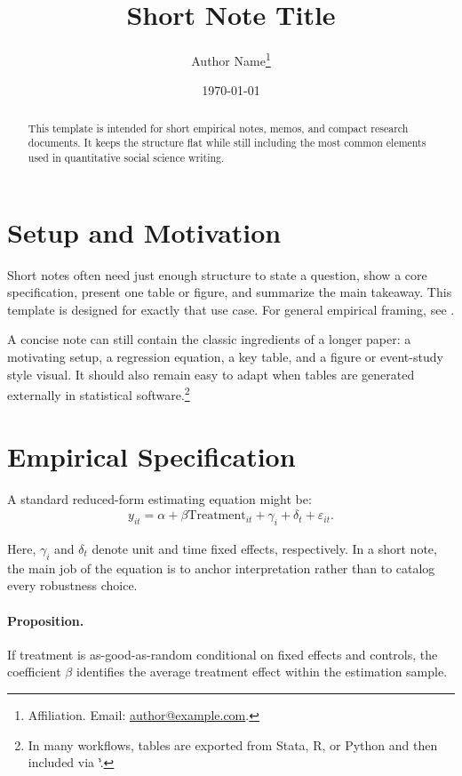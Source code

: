 \documentclass[11pt]{article}
\title{Short Note Title}
\author{Author Name\thanks{Affiliation. Email: \href{mailto:author@example.com}{author@example.com}.}}
\date{\today}
\begin{document}
\maketitle

\begin{abstract}
This template is intended for short empirical notes, memos, and compact research documents. It keeps the structure flat while still including the most common elements used in quantitative social science writing.
\end{abstract}

\section{Setup and Motivation}

Short notes often need just enough structure to state a question, show a core specification, present one table or figure, and summarize the main takeaway. This template is designed for exactly that use case. For general empirical framing, see \citet{angrist2001}.

A concise note can still contain the classic ingredients of a longer paper: a motivating setup, a regression equation, a key table, and a figure or event-study style visual. It should also remain easy to adapt when tables are generated externally in statistical software.\footnote{In many workflows, tables are exported from Stata, R, or Python and then included via `\`.}

\section{Empirical Specification}

A standard reduced-form estimating equation might be:
\begin{align}
    y_{it} = \alpha + \beta \text{Treatment}_{it} + \gamma_i + \delta_t + \varepsilon_{it}.
\end{align}

Here, $\gamma_i$ and $\delta_t$ denote unit and time fixed effects, respectively. In a short note, the main job of the equation is to anchor interpretation rather than to catalog every robustness choice.

\paragraph{Proposition.} If treatment is as-good-as-random conditional on fixed effects and controls, the coefficient $\beta$ identifies the average treatment effect within the estimation sample.
\end{document}
